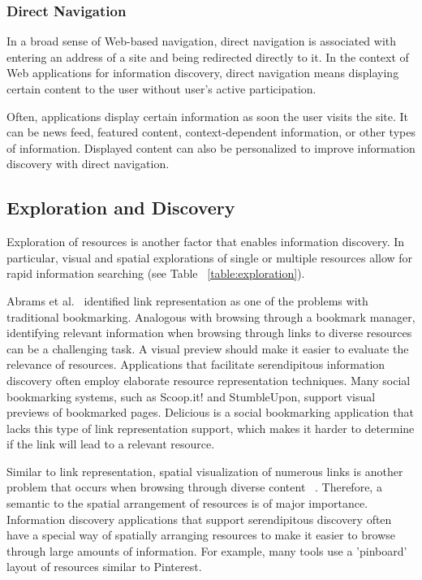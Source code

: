 {{{\subsubsection{Direct Navigation}
In a broad sense of Web-based navigation, direct navigation is associated with entering an address of a site and being redirected directly to it. In the context of Web applications for information discovery, direct navigation means displaying certain content to the user without user's active participation.  

Often, applications display certain information as soon the user visits the site. It can be news feed, featured content, context-dependent information, or other types of information. Displayed content can also be personalized to improve information discovery with direct navigation.

} %


} %

{\subsection{Exploration and Discovery}
Exploration of resources is another factor that enables information discovery. In particular, visual and spatial explorations of single or multiple resources allow for rapid information searching (see Table ~\ref{table:exploration}). 

Abrams et al.~\cite{abrams} identified link representation as one of the problems with traditional bookmarking. Analogous with browsing through a bookmark manager, identifying relevant information when browsing through links to diverse resources can be a challenging task. A visual preview should make it easier to evaluate the relevance of resources. Applications that facilitate serendipitous information discovery often employ elaborate resource representation techniques. Many social bookmarking systems, such as Scoop.it! and StumbleUpon, support visual previews of bookmarked pages. Delicious is a social bookmarking application that lacks this type of link representation support, which makes it harder to determine if the link will lead to a relevant resource.

Similar to link representation, spatial visualization of numerous links is another problem that occurs when browsing through diverse content ~\cite{abrams}. Therefore, a semantic to the spatial arrangement of resources is of major importance. Information discovery applications that support serendipitous discovery often have a special way of spatially arranging resources to make it easier to browse through large amounts of information. For example, many tools use a 'pinboard' layout of resources similar to Pinterest.

}}
